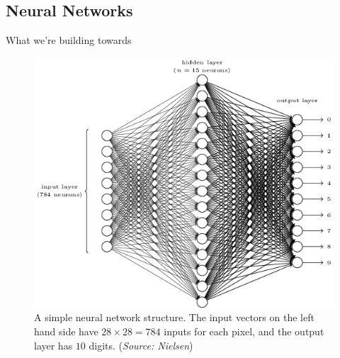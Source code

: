 \documentclass[xcolor=dvipsnames, fontsize=11pt, %
pagesize, %
parskip=half-, t]{beamer}
\begin{document}
\subsection{Neural Networks}
\begin{frame}{What we're building towards}
\begin{figure}
\center
\includegraphics[scale=0.36]{goal.png}
\caption{A simple neural network structure. The input vectors on the left hand side have $28\times 28=784$ inputs for each pixel, and the output layer has $10$ digits. (\textit{Source: Nielsen}) }
\end{figure}
\end{frame}
\end{document}

